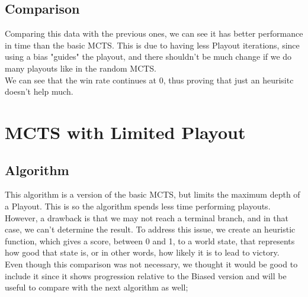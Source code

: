 \documentclass{article}
\begin{document}
  \subsection{Comparison}
  Comparing this data with the previous ones, we can see it has better performance in time than the basic MCTS. This is due to having less Playout iterations,
  since using a bias "guides" the playout, and there shouldn't be much change if we do many playouts like in the random MCTS.\\
  We can see that the win rate continues at 0, thus proving that just an heurisitc doesn't help much. 

  \section{MCTS with Limited Playout}

  \subsection{Algorithm}
  This algorithm is a version of the basic MCTS,  but limits the maximum depth of a Playout. This is so the algorithm spends less time performing playouts. However,
  a drawback is that we may not reach a terminal branch, and in that case, we can't determine the result. To address this issue, we create an heuristic function,
  which gives a score, between 0 and 1, to a world state, that represents how good that state is, or in other words, how likely it is to lead to victory. \\
  Even though this comparison was not necessary, we thought it would be good to include it since it shows progression relative to the Biased version and will be useful
  to compare with the next algorithm as well;
  
\end{document}
